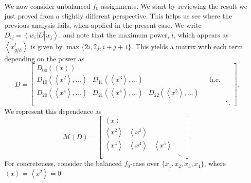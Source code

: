 \documentclass{theoretics}
\begin{document}
We now consider unbalanced $f_{0}$-assignments. We start by reviewing the result we just proved from a slightly different perspective. This helps us see where the previous analysis fails, when applied in the present case.  We write $D_{ij}=\left\langle w_{i}\right|D\left|w_{j}\right\rangle $,
and note that the maximum power, $l$, which appears as $\left\langle x_{g/h}^{l}\right\rangle $
is given by $\max\{2i,2j,i+j+1\}$. This yields a matrix with each
term depending on the power as
\begin{displaymath}
  D=\left[\begin{array}{cccccc}
      D_{00}(\left\langle x\right\rangle )                                                                                                                                       \\
      D_{10}(\left\langle x^{2}\right\rangle ,\dots) & D_{11}(\left\langle x^{3}\right\rangle ,\dots) &                                                &  & \text{h.c.}          \\
      D_{20}(\left\langle x^{4}\right\rangle ,\dots) & D_{21}(\left\langle x^{4}\right\rangle ,\dots) & D_{22}(\left\langle x^{5}\right\rangle ,\dots)                           \\
                                                     &                                                &                                                &  &             & \ddots
    \end{array}\right].
\end{displaymath}
We represent this dependence as
\begin{displaymath}
  \mathcal{M}(D)=\left[\begin{array}{cccc}
      \left\langle x\right\rangle                                                                                  \\
      \left\langle x^{2}\right\rangle & \left\langle x^{3}\right\rangle                                            \\
      \left\langle x^{4}\right\rangle & \left\langle x^{4}\right\rangle & \left\langle x^{5}\right\rangle          \\
                                      &                                 &                                 & \ddots
    \end{array}\right].
\end{displaymath}
For concreteness, consider the balanced $f_{0}$-case over $\{x_{1},x_{2},x_{3},x_{4}\}$,
where $\left\langle x\right\rangle =\left\langle x^{2}\right\rangle =0$
\end{document}
